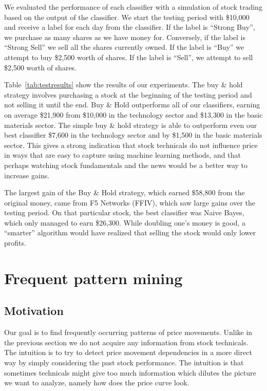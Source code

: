 \documentclass[10pt]{article}
\begin{document}
We evaluated the performance of each classifier with a simulation of stock
trading based on the output of the classifier. We start the testing period with
\$10,000 and receive a label for each day from the classifier. If the label is ``Strong Buy'',
we purchase as many shares as we have money for. Conversely, if the label is
``Strong Sell'' we sell all the shares currently owned. If the label is ``Buy''
we attempt to buy \$2,500 worth of shares. If the label is ``Sell'', we attempt
to sell \$2,500 worth of shares.

Table~\ref{tab:testresults} show the results of our experiments. The buy \&
hold strategy involves purchasing a stock at the beginning of the testing
period and not selling it until the end. Buy \& Hold outperforms all of our
classifiers, earning on average \$21,900 from \$10,000 in the technology sector
and \$13,300 in the basic materials sector. The simple buy \& hold strategy is
able to outperform even our best classifier \$7,600 in the technology sector
and by \$1,500 in the basic materials sector. This gives a strong indication
that stock technicals do not influence price in ways that are easy to capture
using machine learning methods, and that perhaps watching stock fundamentals
and the news would be a better way to increase gains. 

The largest gain of the Buy \& Hold strategy, which earned \$58,800 from the
original money, came from F5 Networks (FFIV), which saw large gains over the
testing period. On that particular stock, the best classifier was Naive Bayes,
which only managed to earn \$26,300. While doubling one's money is good, a
``smarter'' algorithm would have realized that selling the stock would only
lower profits.

\section{Frequent pattern mining}
\label{sec:freqpattern}
\subsection{Motivation} 

Our goal is to find frequently occurring patterns of price movements. Unlike in
the previous section we do not acquire any information from stock technicals.
The intuition is to try to detect price movement dependencies in a more direct
way by simply considering the past stock performance. The intuition is that
sometimes technicals might give too much information which dilutes the picture
we want to analyze, namely how does the price curve look.
\end{document}
